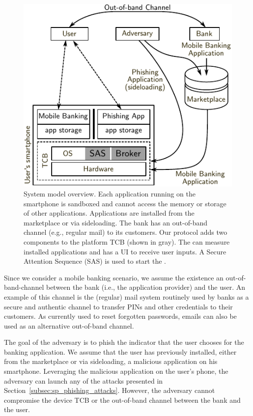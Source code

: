 \begin{figure}[!t]
    \centering
    \includegraphics[width=.7\linewidth]{figures/securingphone/phishing_system_model}
    \caption[System model overview]{
    System model overview. Each application running on the smartphone is sandboxed and cannot access the memory or storage of other applications. 
    Applications are installed from the marketplace or via sideloading.
    The bank has an out-of-band channel (e.g., regular mail) to its customers.
    Our protocol adds two components to the platform TCB (shown in gray).
    The \secmodule{} can measure installed applications and has a UI to receive user inputs.
    A Secure Attention Sequence (SAS) is used to start the \secmodule{}.}
    \label{fig:sp_phishing_system-model}
\end{figure}

Since we consider a mobile banking scenario, we assume the existence an out-of-band-channel between the bank (i.e., the application provider) and the user.
An example of this channel is the (regular) mail system routinely used by banks as a secure and authentic channel to transfer PINs and other credentials to their customers.
As currently used to reset forgotten passwords, emails can also be used as an alternative out-of-band channel.

The goal of the adversary is to phish the indicator that the user chooses for the banking application.
We assume that the user has previously installed, either from the marketplace or via sideloading, a malicious application on his smartphone.
Leveraging the malicious application on the user's phone, the adversary can launch any of the attacks presented in Section~\ref{subsec:sp_phishing_attacks}.
However, the adversary cannot compromise the device TCB or the out-of-band channel between the bank and the user.


